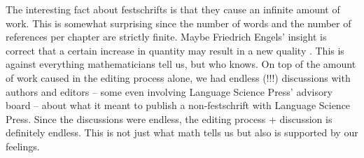 \documentclass[output=paper,colorlinks,citecolor=brown]{langscibook}
\begin{document}
The interesting fact about festschrifts is that they cause an infinite amount of work. This is somewhat
surprising since the number of words and the number of references per chapter are strictly
finite. Maybe Friedrich Engels' insight is correct that a certain increase in quantity may result in a new
quality \citep[]{Engels1873a-u}. This is against everything mathematicians tell us, but who knows.
On top of the amount of work caused in the editing process alone, we had endless (!!!) discussions
with authors and editors -- some even involving Language Science Press' advisory board -- about what it meant to publish a non-festschrift with Language Science
Press. Since the discussions were endless, the editing process + discussion is definitely endless. This
is not just what math tells us but also is supported by our feelings.
\end{document}
